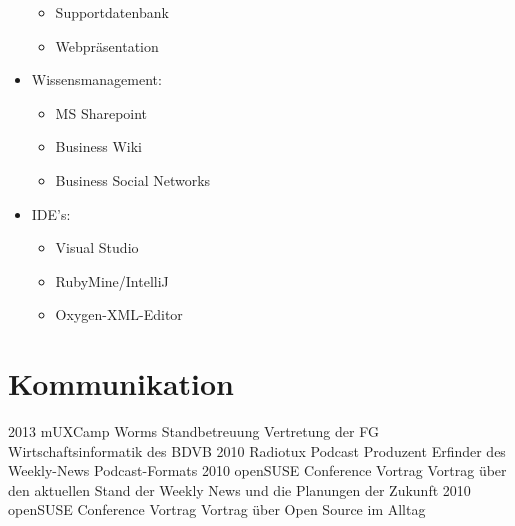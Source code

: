 \documentclass[a4paper]{friggeri-cv} %
\begin{document}
\begin{itemize}
\begin{itemize}
      \item Supportdatenbank \hfill {} \hfill
      \item Webpräsentation \hfill {} \hfill
    \end{itemize}
\item Wissensmanagement:
    \begin{itemize}
      \item MS Sharepoint \hfill {} \hfill
      \item Business Wiki \hfill {} \hfill
      \item Business Social Networks \hfill {} \hfill
    \end{itemize}
\item IDE's:
    \begin{itemize}
      \item Visual Studio \hfill {} \hfill
      \item RubyMine/IntelliJ \hfill {} \hfill
      \item Oxygen-XML-Editor \hfill {} \hfill
    \end{itemize}
\end{itemize}


\section{Kommunikation}

\begin{entrylist}
\entry
{2013}
{mUXCamp Worms}
{Standbetreuung}
{Vertretung der FG Wirtschaftsinformatik des BDVB}
\entry
{2010}
{Radiotux Podcast}
{Produzent}
{Erfinder des Weekly-News Podcast-Formats}
\entry
{2010}
{openSUSE Conference}
{Vortrag}
{Vortrag über den aktuellen Stand der Weekly News und die Planungen der Zukunft}
\entry
{2010}
{openSUSE Conference}
{Vortrag}
{Vortrag über Open Source im Alltag}
\end{entrylist}
\end{document}
